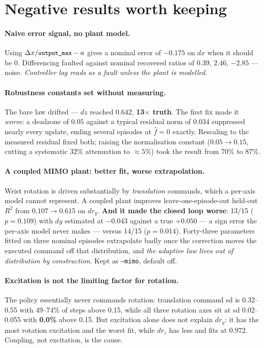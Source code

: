 \documentclass[11pt,a4paper]{article}
\newcommand{\code}[1]{\texttt{\small #1}}
\newcommand{\fhat}{\hat{f}}
\begin{document}
\section{Negative results worth keeping}
\label{sec:failures}

\paragraph{Naive error signal, no plant model.} Using
$\Delta x/\code{output\_max} - a$ gives a nominal error of $-0.175$ on $dx$ when
it should be $0$. Differencing faulted against nominal recovered ratios of
$0.39$, $2.46$, $-2.85$ --- noise. \emph{Controller lag reads as a fault unless
the plant is modelled.}

\paragraph{Robustness constants set without measuring.} The bare law drifted ---
$dz$ reached $0.642$, \textbf{13$\times$ truth}. The first fix made it
\emph{worse}: a deadzone of $0.05$ against a typical residual norm of $0.034$
suppressed nearly every update, ending several episodes at $\fhat = 0$ exactly.
Rescaling to the measured residual fixed both; raising the normalisation constant
($0.05 \to 0.15$, cutting a systematic 32\% attenuation to $\approx 5\%$) took the
result from 70\% to 87\%.

\paragraph{A coupled MIMO plant: better fit, worse extrapolation.} Wrist rotation
is driven substantially by \emph{translation} commands, which a per-axis model
cannot represent. A coupled plant improves leave-one-episode-out held-out $R^2$
from $0.107 \to 0.615$ on $d r_y$. \textbf{And it made the closed loop worse}:
13/15 ($p = 0.109$) with $dy$ estimated at $-0.043$ against a true $+0.050$ --- a
sign error the per-axis model never makes --- versus 14/15 ($p = 0.014$). Forty-three
parameters fitted on three nominal episodes extrapolate badly once the correction
moves the executed command off that distribution, and \emph{the adaptive law lives
out of distribution by construction}. Kept as \code{--mimo}, default off.

\paragraph{Excitation is not the limiting factor for rotation.} The policy
essentially never commands rotation: translation command sd is 0.32--0.55 with
49--74\% of steps above 0.15, while all three rotation axes sit at sd 0.02--0.055
with \textbf{0.0\%} above 0.15. But excitation alone does not explain $d r_y$: it
has the most rotation excitation and the worst fit, while $d r_z$ has less and
fits at 0.972. Coupling, not excitation, is the cause.
\end{document}
